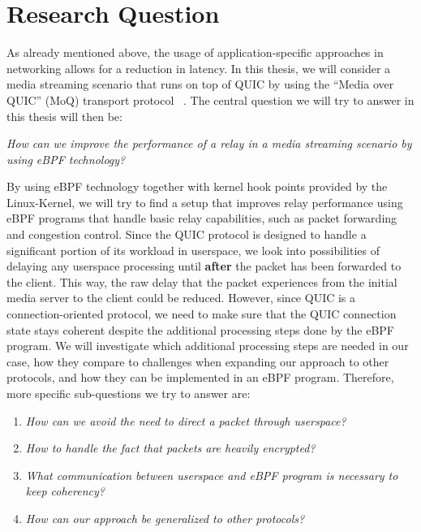 \section{Research Question}\label{sec:research_question}

As already mentioned above, the usage of application-specific approaches in networking allows for a reduction in latency.
In this thesis, we will consider a media streaming scenario that runs on top of QUIC by using the ``Media over QUIC'' (MoQ) transport protocol
~\parencite{draft-moqtransport}.
The central question we will try to answer in this thesis will then be:
\vspace{0.5cm}
\begin{center}
    \textit{How can we improve the performance of a relay in a media streaming scenario by using eBPF technology?}
\end{center}
\vspace{0.5cm}
By using eBPF technology together with kernel hook points provided by the Linux-Kernel, we will try to find a setup that improves relay 
performance using eBPF programs that handle basic relay capabilities, such as packet forwarding and congestion control.
Since the QUIC protocol is designed to handle a significant portion of its workload in userspace, we look into possibilities of delaying any 
userspace processing until \textbf{after} the packet has been forwarded to the client.
This way, the raw delay that the packet experiences from the initial media server to the client could be reduced. 
However, since QUIC is a connection-oriented protocol, we need to make sure that the QUIC connection state stays 
coherent despite the additional processing steps done by the eBPF program.
We will investigate which additional processing steps are needed in our case, how they compare to challenges when expanding our approach to other protocols, 
and how they can be implemented in an eBPF program.
Therefore, more specific sub-questions we try to answer are:
\vspace{0.5cm}
\begin{enumerate}
    \item \textit{How can we avoid the need to direct a packet through userspace?}
    \item \textit{How to handle the fact that packets are heavily encrypted?}
    \item \textit{What communication between userspace and eBPF program is necessary to keep coherency?}
    \item \textit{How can our approach be generalized to other protocols?}
\end{enumerate}
\vspace{0.5cm}